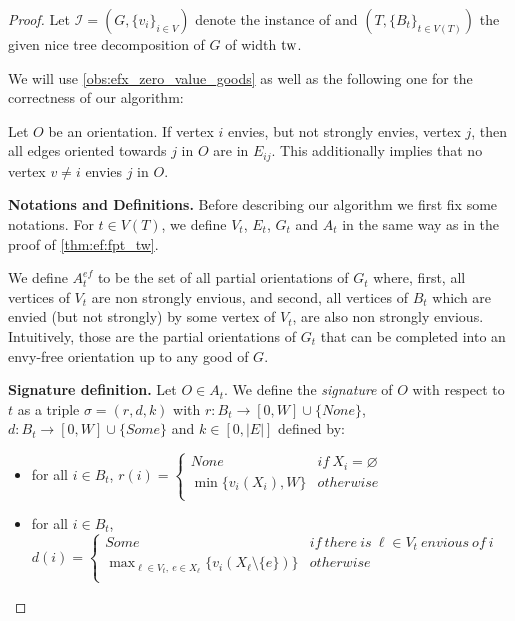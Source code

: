 \begin{proof}
    Let $\mathcal{I} = (G,\{v_i\}_{i\in V})$ denote the instance of {\EFmc}
    and $(T,\{B_t\}_{t\in V(T)})$ the given nice tree decomposition of $G$ of width $\mathrm{tw}$.

    We will use \cref{obs:efx_zero_value_goods} as well as the following one for the correctness of our algorithm:

    \begin{observation}\label{obs:only_one_envious}
        Let $O$ be an orientation.
        If vertex $i$ envies, but not strongly envies, vertex $j$, then
        all edges oriented towards $j$ in $O$ are in $E_{ij}$. This additionally implies that no vertex $v\neq i$ envies $j$ in $O$.
    \end{observation}

    \textbf{Notations and Definitions.}
    Before describing our algorithm we first fix some notations. For $t\in V(T)$, we define $V_t$, $E_t$, $G_t$ and $A_t$ in the same way as in the proof of \cref{thm:ef:fpt_tw}.

    We define $A_t^{ef}$ to be the set of all partial orientations of $G_t$ where, first, all vertices of $V_t$ are  non strongly envious, and second, all vertices of $B_t$ which are envied (but not strongly) by some vertex of $V_t$, are also non strongly envious. Intuitively, those are the partial orientations of $G_t$ that can be completed into an envy-free orientation up to any good of $G$.

    \textbf{Signature definition.} Let $O\in A_t$. We define the \emph{signature} of $O$ with respect to $t$ as a triple $\sigma=(r,d,k)$ with $r\colon B_t\to [0,W]\cup\{None\}$, $d\colon B_t\to [0,W]\cup\{Some\}$ and $k\in [0,|E|]$ defined by:
    \begin{itemize}
        \item for all $i\in B_t$, $r(i)=\begin{cases}
            None & if\ X_i=\varnothing \\
            \min\{v_i(X_i),W\} & otherwise \\
        \end{cases}$

        \item for all $i\in B_t$, $d(i)=\begin{cases}
            Some & if\ there\ is\ \ell\in V_t\ envious\ of\ i\\
            \max_{\ell\in V_t,\ e\in X_\ell}\{v_i(X_\ell\setminus\{e\})\} & otherwise \\
        \end{cases}$


\end{itemize}
\end{proof}

